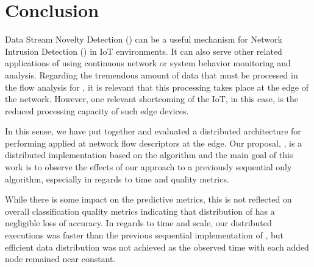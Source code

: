 
\section{Conclusion} 
\label{sec:conclusion}


Data Stream Novelty Detection (\nd) can be a useful mechanism for Network
Intrusion Detection (\nids) in IoT environments. It can also serve other related applications of \nd using continuous
network or system behavior monitoring and analysis.
Regarding the tremendous amount of data that must be processed in the flow analysis for \nd, it 
is relevant that this processing takes place at the edge of the network. 
However, one relevant shortcoming of the IoT, in this case, is the reduced processing capacity of such edge devices. 

In this sense, we have put together and evaluated a distributed architecture for
performing \nd applied at network flow descriptors at the edge.
Our proposal, \mfog, is a distributed \nd implementation based on the \minas
algorithm and the main goal of this work is to observe the effects of our
approach to a previously sequential only algorithm, especially in regards to
time and quality metrics.


While there is some impact on the predictive metrics, this is not reflected on
overall classification quality metrics indicating that distribution of \minas
has a negligible loss of accuracy.
In regards to time and scale, our distributed executions was faster than the 
previous sequential implementation of \minas, but efficient data distribution was not achieved as the
observed time with each added node remained near constant.

